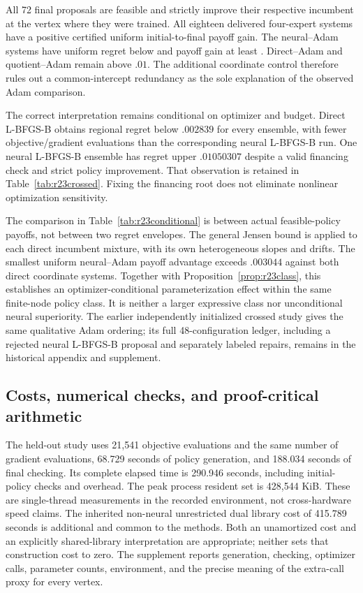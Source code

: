 All 72 final proposals are feasible and strictly improve their respective incumbent at the vertex where they were trained. All eighteen delivered four-expert systems have a positive certified uniform initial-to-final payoff gain. The neural--Adam systems have uniform regret below \RXXIIINeuralRegret{} and payoff gain at least \RXXIIIGainMin{}. Direct--Adam and quotient--Adam remain above $.01$. The additional coordinate control therefore rules out a common-intercept redundancy as the sole explanation of the observed Adam comparison.

The correct interpretation remains conditional on optimizer and budget. Direct L-BFGS-B obtains regional regret below $.002839$ for every ensemble, with fewer objective/gradient evaluations than the corresponding neural L-BFGS-B run. One neural L-BFGS-B ensemble has regret upper $.01050307$ despite a valid financing check and strict policy improvement. That observation is retained in Table~\ref{tab:r23crossed}. Fixing the financing root does not eliminate nonlinear optimization sensitivity.



The comparison in Table~\ref{tab:r23conditional} is between actual feasible-policy payoffs, not between two regret envelopes. The general Jensen bound is applied to each direct incumbent mixture, with its own heterogeneous slopes and drifts. The smallest uniform neural--Adam payoff advantage exceeds $.003044$ against both direct coordinate systems. Together with Proposition~\ref{prop:r23class}, this establishes an optimizer-conditional parameterization effect within the same finite-node policy class. It is neither a larger expressive class nor unconditional neural superiority. The earlier independently initialized crossed study gives the same qualitative Adam ordering; its full 48-configuration ledger, including a rejected neural L-BFGS-B proposal and separately labeled repairs, remains in the historical appendix and supplement.

\subsection{Costs, numerical checks, and proof-critical arithmetic}
The held-out study uses 21,541 objective evaluations and the same number of gradient evaluations, 68.729 seconds of policy generation, and 188.034 seconds of final checking. Its complete elapsed time is 290.946 seconds, including initial-policy checks and overhead. The peak process resident set is 428,544 KiB. These are single-thread measurements in the recorded environment, not cross-hardware speed claims. The inherited non-neural unrestricted dual library cost of 415.789 seconds is additional and common to the methods. Both an unamortized cost and an explicitly shared-library interpretation are appropriate; neither sets that construction cost to zero. The supplement reports generation, checking, optimizer calls, parameter counts, environment, and the precise meaning of the extra-call proxy for every vertex.

